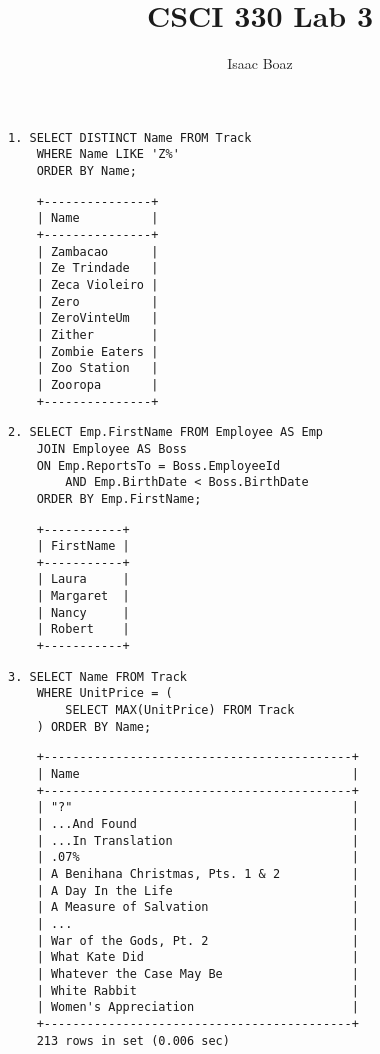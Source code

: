 \documentclass{article}
\title{CSCI 330 Lab 3}
\author{Isaac Boaz}
\begin{document}
\maketitle

\lstset{
    language=SQL,
    basicstyle=\small,
    showstringspaces=false
}

\begin{lstlisting}
1. SELECT DISTINCT Name FROM Track
    WHERE Name LIKE 'Z%'
    ORDER BY Name;\end{lstlisting}
\begin{lstlisting}
    +---------------+
    | Name          |
    +---------------+
    | Zambacao      |
    | Ze Trindade   |
    | Zeca Violeiro |
    | Zero          |
    | ZeroVinteUm   |
    | Zither        |
    | Zombie Eaters |
    | Zoo Station   |
    | Zooropa       |
    +---------------+
\end{lstlisting}
\begin{lstlisting}
2. SELECT Emp.FirstName FROM Employee AS Emp
    JOIN Employee AS Boss
    ON Emp.ReportsTo = Boss.EmployeeId
        AND Emp.BirthDate < Boss.BirthDate
    ORDER BY Emp.FirstName;
\end{lstlisting}
\begin{lstlisting}
    +-----------+
    | FirstName |
    +-----------+
    | Laura     |
    | Margaret  |
    | Nancy     |
    | Robert    |
    +-----------+
\end{lstlisting}

\begin{lstlisting}
3. SELECT Name FROM Track
    WHERE UnitPrice = (
        SELECT MAX(UnitPrice) FROM Track
    ) ORDER BY Name;
\end{lstlisting}

\begin{lstlisting}
    +-------------------------------------------+
    | Name                                      |
    +-------------------------------------------+
    | "?"                                       |
    | ...And Found                              |
    | ...In Translation                         |
    | .07%                                      |
    | A Benihana Christmas, Pts. 1 & 2          |
    | A Day In the Life                         |
    | A Measure of Salvation                    |
    | ...                                       |
    | War of the Gods, Pt. 2                    |
    | What Kate Did                             |
    | Whatever the Case May Be                  |
    | White Rabbit                              |
    | Women's Appreciation                      |
    +-------------------------------------------+
    213 rows in set (0.006 sec)
\end{lstlisting}
\end{document}
